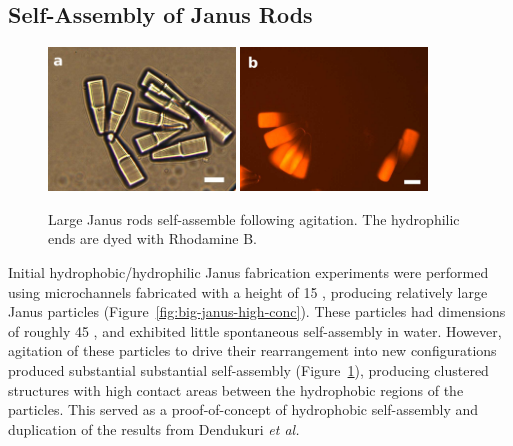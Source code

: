\subsection{Self-Assembly of Janus Rods}
\label{sec:assembly-janus-rods}


\begin{figure}
\begin{center}
\includegraphics[height=1.5in]{figures/rods/large-janus-rods-45x11x11um.jpg}
\includegraphics[height=1.5in]{figures/rods/large-janus-self-assembly.jpg}
\end{center}
\caption{Large Janus rods self-assemble following agitation. The hydrophilic 
ends are dyed with Rhodamine B.}
\label{fig:big-janus-assembly}
\end{figure}

Initial hydrophobic/hydrophilic Janus fabrication experiments 
were performed using microchannels fabricated with a height of 15 \microns, 
producing relatively large Janus particles (Figure~\ref{fig:big-janus-high-conc}). These particles had dimensions 
of roughly 45   \microns, and exhibited little spontaneous self-assembly in water.  However, agitation
of these particles to drive their rearrangement into new configurations produced substantial substantial
self-assembly (Figure~\ref{fig:big-janus-assembly}), producing clustered structures with high contact
areas between the hydrophobic regions of the particles.  This served as a proof-of-concept of 
hydrophobic self-assembly and duplication of the
results from Dendukuri \textit{et al.}~\cite{dendukuri-amph}  

